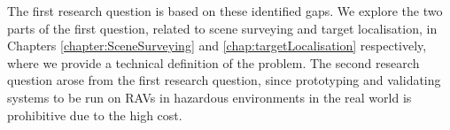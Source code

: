The first research question is based on these identified gaps. We explore the two parts of the first question, related to scene surveying and target localisation, in Chapters \ref{chapter:SceneSurveying} and \ref{chap:targetLocalisation} respectively, where we provide a technical definition of the problem. The second research question arose from the first research question, since prototyping and validating systems to be run on RAVs in hazardous environments in the real world is prohibitive due to the high cost.